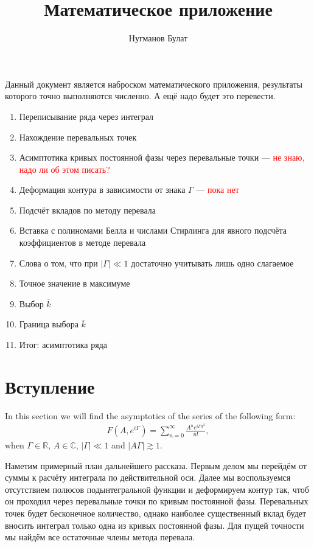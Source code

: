 \documentclass[a4paper, 12pt]{article}
\author{Нугманов Булат}
\title{Математическое приложение}
\newenvironment{eqw}{\begin{equation} \begin{aligned}}   
    {\end{aligned}    \end{equation}}
\begin{document}
\maketitle
Данный документ является наброском математического приложения, результаты которого точно выполняются численно. А ещё надо будет это перевести.

\begin{enumerate}
    \item Переписывание ряда через интеграл
    \item Нахождение перевальных точек
    \item Асимптотика кривых постоянной фазы через перевальные точки --- \textcolor{red}{не знаю, надо ли об этом писать?}
    \item Деформация контура в зависимости от знака $\Gamma$ --- \textcolor{red}{пока нет}
    \item Подсчёт вкладов по методу перевала
    \item Вставка с полиномами Белла и числами Стирлинга для явного подсчёта коэффициентов в методе перевала
    \item Слова о том, что при $|\Gamma| \ll 1$ достаточно учитывать лишь одно слагаемое
    \item Точное значение в максимуме
    \item Выбор $\overline{k}$
    \item Граница выбора $\overline{k}$
    \item Итог: асимптотика ряда
\end{enumerate}
\section*{Вступление}
In this section we will find the asymptotics of the series of the following form:
\begin{eqw}\label{F def}
    F(A, e^{i\Gamma}) = \sum\limits_{n=0}^{\infty} \frac{A^n e^{i\Gamma n^2}}{n!},
\end{eqw}
when $\Gamma\in \mathbb{R}$, $A\in \mathbb{C}$, $|\Gamma| \ll 1$ and $|A\Gamma|\gtrsim 1$. 

Наметим примерный план дальнейшего рассказа. Первым делом мы перейдём от суммы к расчёту интеграла по действительной оси. Далее мы воспользуемся отсутствием полюсов подынтегральной функции и деформируем контур так, чтоб он проходил через перевальные точки по кривым постоянной фазы. Перевальных точек будет бесконечное количество, однако наиболее существенный вклад будет вносить интеграл только одна из кривых постоянной фазы. Для пущей точности мы найдём все остаточные члены метода перевала. 
\end{document}

